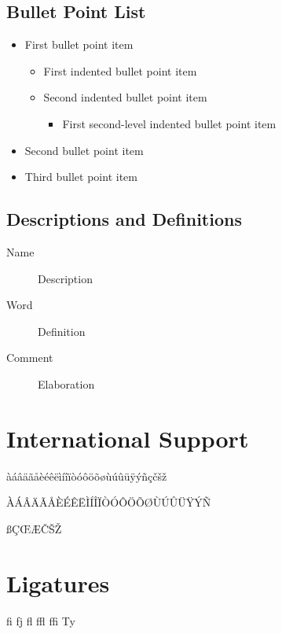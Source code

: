 \documentclass[
	11pt, %
	fleqn, %
	a4paper, %
	oneside, %
]{LegrandOrangeBook}
\begin{document}
\subsection{Bullet Point List}

\begin{itemize}
	\item First bullet point item
	\begin{itemize}
		\item First indented bullet point item
		\item Second indented bullet point item
		\begin{itemize}
			\item First second-level indented bullet point item
		\end{itemize}
	\end{itemize}
	\item Second bullet point item
	\item Third bullet point item
\end{itemize}

\subsection{Descriptions and Definitions}

\begin{description}
	\item[Name] Description
	\item[Word] Definition
	\item[Comment] Elaboration
\end{description}


\section{International Support}

àáâäãåèéêëìíîïòóôöõøùúûüÿýñçčšž

\noindent ÀÁÂÄÃÅÈÉÊËÌÍÎÏÒÓÔÖÕØÙÚÛÜŸÝÑ

\noindent ßÇŒÆČŠŽ


\section{Ligatures}

fi fj fl ffl ffi Ty

\end{document}

